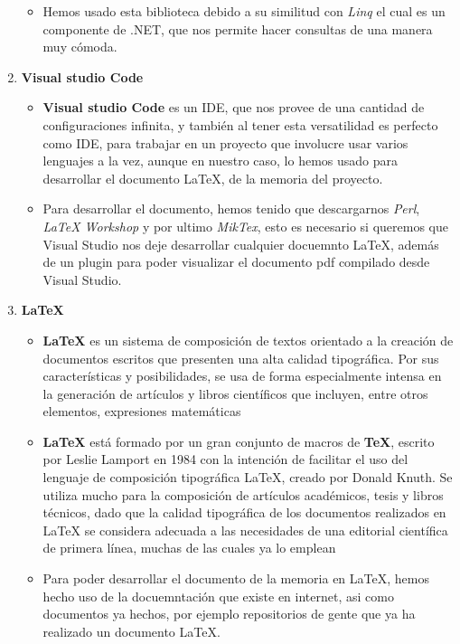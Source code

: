 \documentclass[a4paper]{article}
\begin{document}
\begin{enumerate}
\begin{itemize}
              \item Hemos usado esta biblioteca debido a su similitud con \textit{Linq} el cual es un componente de .NET, que nos permite hacer consultas de una manera muy cómoda.
          \end{itemize}
    \item \textbf{Visual studio Code}
          \begin{itemize}
              \item \textbf{Visual studio Code} es un IDE, que nos provee de una cantidad de configuraciones infinita, y también al tener esta versatilidad es perfecto como IDE, para trabajar en un proyecto que involucre usar varios lenguajes a la vez, aunque en nuestro caso, lo hemos usado para desarrollar el documento \LaTeX, de la memoria del proyecto.
              \item Para desarrollar el documento, hemos tenido que descargarnos \textit{Perl}, \textit{LaTeX Workshop} y por ultimo \textit{MikTex}, esto es necesario si queremos que Visual Studio nos deje desarrollar cualquier docuemnto \LaTeX, además de un plugin para poder visualizar el documento pdf compilado desde Visual Studio.
          \end{itemize}
    \item \textbf{\LaTeX}
          \begin{itemize}
              \item \textbf{\LaTeX} es un sistema de composición de textos orientado a la creación de documentos escritos que presenten una alta calidad tipográfica. Por sus características y posibilidades, se usa de forma especialmente intensa en la generación de artículos y libros científicos que incluyen, entre otros elementos, expresiones matemáticas
              \item \textbf{\LaTeX} está formado por un gran conjunto de macros de \textbf{TeX}, escrito por Leslie Lamport en 1984 con la intención de facilitar el uso del lenguaje de composición tipográfica \LaTeX, creado por Donald Knuth. Se utiliza mucho para la composición de artículos académicos, tesis y libros técnicos, dado que la calidad tipográfica de los documentos realizados en LaTeX se considera adecuada a las necesidades de una editorial científica de primera línea, muchas de las cuales ya lo emplean
              \item Para poder desarrollar el documento de la memoria en \LaTeX, hemos hecho uso de la docuemntación que existe en internet, asi como documentos ya hechos, por ejemplo repositorios de gente que ya ha realizado un documento \LaTeX.

\end{itemize}
\end{enumerate}
\end{document}
